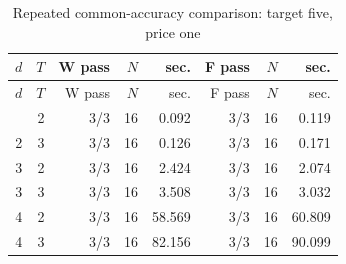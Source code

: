 {\small
\setlength{\tabcolsep}{3.5pt}
\begin{longtable}{@{}rrrrrrrr@{}}
\caption{Repeated common-accuracy comparison: target five, price one}\label{tab:dimension49}\\
\toprule
$d$ & $T$ & W pass & $N$ & sec. & F pass & $N$ & sec. \\
\midrule
\endfirsthead
\toprule
$d$ & $T$ & W pass & $N$ & sec. & F pass & $N$ & sec. \\
\midrule
\endhead
\bottomrule
\endfoot
2 & 2 & 3/3 & 16 & 0.092 & 3/3 & 16 & 0.119 \\
2 & 3 & 3/3 & 16 & 0.126 & 3/3 & 16 & 0.171 \\
3 & 2 & 3/3 & 16 & 2.424 & 3/3 & 16 & 2.074 \\
3 & 3 & 3/3 & 16 & 3.508 & 3/3 & 16 & 3.032 \\
4 & 2 & 3/3 & 16 & 58.569 & 3/3 & 16 & 60.809 \\
4 & 3 & 3/3 & 16 & 82.156 & 3/3 & 16 & 90.099 \\
\end{longtable}
}
